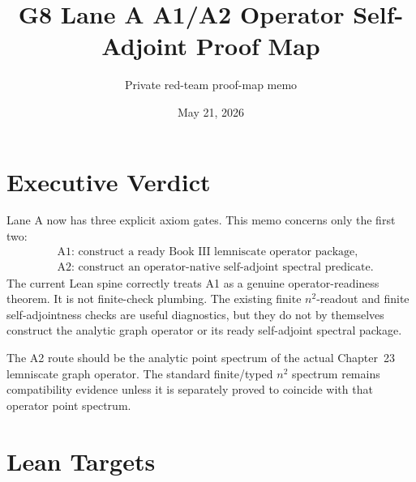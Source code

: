 \documentclass[11pt]{article}
\title{G8 Lane A A1/A2 Operator Self-Adjoint Proof Map}
\author{Private red-team proof-map memo}
\date{May 21, 2026}
\begin{document}
\maketitle

\section*{Executive Verdict}

Lane A now has three explicit axiom gates.  This memo concerns only the first
two:
\[
\begin{aligned}
&\text{A1: construct a ready Book III lemniscate operator package},\\
&\text{A2: construct an operator-native self-adjoint spectral predicate}.
\end{aligned}
\]
The current Lean spine correctly treats A1 as a genuine operator-readiness
theorem.  It is not finite-check plumbing.  The existing finite
\(n^2\)-readout and finite self-adjointness checks are useful diagnostics, but
they do not by themselves construct the analytic graph operator or its ready
self-adjoint spectral package.

The A2 route should be the analytic point spectrum of the actual Chapter~23
lemniscate graph operator.  The standard finite/typed \(n^2\) spectrum remains
compatibility evidence unless it is separately proved to coincide with that
operator point spectrum.

\section*{Lean Targets}
\end{document}
